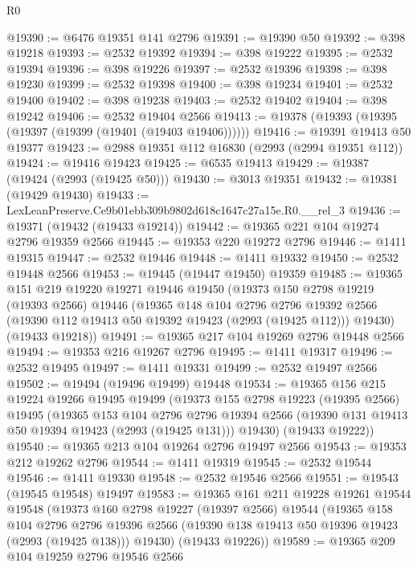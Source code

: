 \begin{lexlean}{R0}
\begin{coremodule}
@19390 := @6476 @19351 @141 @2796
@19391 := @19390 @50
@19392 := @398 @19218
@19393 := @2532 @19392
@19394 := @398 @19222
@19395 := @2532 @19394
@19396 := @398 @19226
@19397 := @2532 @19396
@19398 := @398 @19230
@19399 := @2532 @19398
@19400 := @398 @19234
@19401 := @2532 @19400
@19402 := @398 @19238
@19403 := @2532 @19402
@19404 := @398 @19242
@19406 := @2532 @19404 @2566
@19413 := @19378 (@19393 (@19395 (@19397 (@19399 (@19401 (@19403 @19406))))))
@19416 := @19391 @19413 @50 @19377
@19423 := @2988 @19351 @112 @16830 (@2993 (@2994 @19351 @112))
@19424 := @19416 @19423
@19425 := @6535 @19413
@19429 := @19387 (@19424 (@2993 (@19425 @50)))
@19430 := @3013 @19351
@19432 := @19381 (@19429 @19430)
@19433 := LexLeanPreserve.Ce9b01ebb309b9802d618c1647c27a15e.R0.__rel_3
@19436 := @19371 (@19432 (@19433 @19214))
@19442 := @19365 @221 @104 @19274 @2796 @19359 @2566
@19445 := @19353 @220 @19272 @2796
@19446 := @1411 @19315
@19447 := @2532 @19446
@19448 := @1411 @19332
@19450 := @2532 @19448 @2566
@19453 := @19445 (@19447 @19450) @19359
@19485 := @19365
    @151
    @219
    @19220
    @19271
    @19446
    @19450
    (@19373
      @150
      @2798
      @19219
      (@19393 @2566)
      @19446
      (@19365
        @148
        @104
        @2796
        @2796
        @19392
        @2566
        (@19390 @112 @19413 @50 @19392 @19423 (@2993 (@19425 @112)))
        @19430)
      (@19433 @19218))
@19491 := @19365 @217 @104 @19269 @2796 @19448 @2566
@19494 := @19353 @216 @19267 @2796
@19495 := @1411 @19317
@19496 := @2532 @19495
@19497 := @1411 @19331
@19499 := @2532 @19497 @2566
@19502 := @19494 (@19496 @19499) @19448
@19534 := @19365
    @156
    @215
    @19224
    @19266
    @19495
    @19499
    (@19373
      @155
      @2798
      @19223
      (@19395 @2566)
      @19495
      (@19365
        @153
        @104
        @2796
        @2796
        @19394
        @2566
        (@19390 @131 @19413 @50 @19394 @19423 (@2993 (@19425 @131)))
        @19430)
      (@19433 @19222))
@19540 := @19365 @213 @104 @19264 @2796 @19497 @2566
@19543 := @19353 @212 @19262 @2796
@19544 := @1411 @19319
@19545 := @2532 @19544
@19546 := @1411 @19330
@19548 := @2532 @19546 @2566
@19551 := @19543 (@19545 @19548) @19497
@19583 := @19365
    @161
    @211
    @19228
    @19261
    @19544
    @19548
    (@19373
      @160
      @2798
      @19227
      (@19397 @2566)
      @19544
      (@19365
        @158
        @104
        @2796
        @2796
        @19396
        @2566
        (@19390 @138 @19413 @50 @19396 @19423 (@2993 (@19425 @138)))
        @19430)
      (@19433 @19226))
@19589 := @19365 @209 @104 @19259 @2796 @19546 @2566

\end{coremodule}
\end{lexlean}
